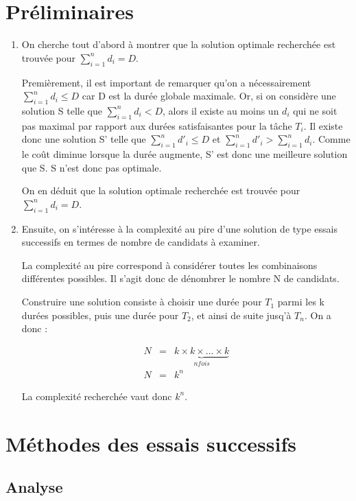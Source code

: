 \documentclass[a4paper, titlepage]{article}
\begin{document}
\section{Préliminaires}

\begin{enumerate}
\item
	On cherche tout d'abord à montrer que la solution optimale recherchée est trouvée pour $\sum_{i=1}^{n} d_i = D$.

	Premièrement, il est important de remarquer qu'on a nécessairement $\sum_{i=1}^{n} d_i \le D$ car D est la durée globale maximale.
	Or, si on considère une solution S telle que $\sum_{i=1}^{n} d_i < D$, alors il existe au moins un $d_i$ qui ne soit pas maximal par rapport aux durées satisfaisantes pour la tâche $T_i$.
	Il existe donc une solution S' telle que $\sum_{i=1}^{n} d'_i \le D$ et $\sum_{i=1}^{n} d'_i > \sum_{i=1}^{n} d_i$.
	Comme le coût diminue lorsque la durée augmente, S' est donc une meilleure solution que S.
	S n'est donc pas optimale.

	On en déduit que la solution optimale recherchée est trouvée pour $\sum_{i=1}^{n} d_i = D$.

\item
	Ensuite, on s'intéresse à la complexité au pire d'une solution de type essais successifs en termes de nombre de candidats à examiner.

	La complexité au pire correspond à considérer toutes les combinaisons différentes possibles.
	Il s'agit donc de dénombrer le nombre N de candidats.

	Construire une solution consiste à choisir une durée pour $T_1$ parmi les k durées possibles, puis une durée pour $T_2$, et ainsi de suite jusq'à $T_n$.
	On a donc :

	\begin{eqnarray*}
		N & = & \underbrace{k \times k \times ... \times k}_{n fois} \\
		N & = & k^n
	\end{eqnarray*}

	La complexité recherchée vaut donc $k^{n}$.

\end{enumerate}

\section{Méthodes des essais successifs}

	\subsection{Analyse}
\end{document}
